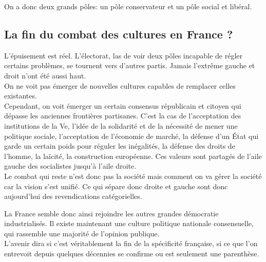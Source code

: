 \documentclass[12pt, a4paper, openany]{book}
\begin{document}
On a donc deux grands pôles: un pôle conservateur et un pôle social et libéral. \\

\subsection{La fin du combat des cultures en France ?}

L'épuisement est réel. L'électorat, las de voir deux pôles incapable de régler certains problèmes, se tournent vers d'autres partis. Jamais l'extrême gauche et droit n'ont été aussi haut. \\
On ne voit pas émerger de nouvelles cultures capables de remplacer celles existantes. \\
Cependant, on voit émerger un certain consensus républicain et citoyen qui dépasse les anciennes frontières partisanes. C'est la cas de l'acceptation des institutions de la Ve, l'idée de la solidarité et de la nécessité de mener une politique sociale, l'acceptation de l'économie de marché, la défense d'un État qui garde un certain poids pour réguler les inégalités, la défense des droits de l'homme, la laïcité, la construction européenne. Ces valeurs sont partagés de l'aile gauche des socialistes jusqu'à l'aile droite. \\
Le combat qui reste n'est donc pas la société mais comment on va gérer la société car la vision s'est unifié. Ce qui sépare donc droite et gauche sont donc aujourd'hui des revendications catégorielles. 


La France semble donc ainsi rejoindre les autres grandes démocratie industrialisés. Il existe maintenant une culture politique nationale consensuelle, qui rassemble une majorité de l'opinion publique. \\
L'avenir dira si c'est véritablement la fin de la spécificité française, si ce que l'on entrevoit depuis quelques décennies se confirme ou est seulement une parenthèse. 
\end{document}
